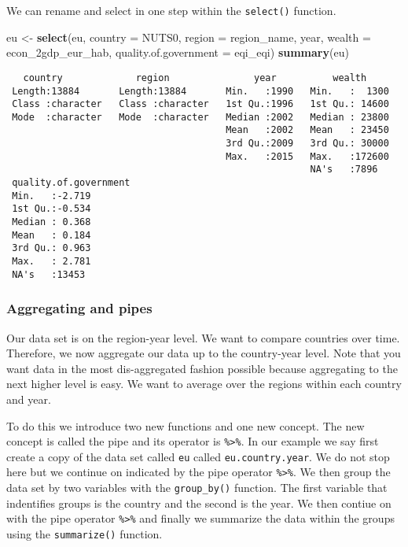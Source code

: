 \documentclass[]{article}
\newenvironment{Shaded}{\begin{snugshade}}{\end{snugshade}}
\newcommand{\DataTypeTok}[1]{\textcolor[rgb]{0.13,0.29,0.53}{#1}}
\newcommand{\KeywordTok}[1]{\textcolor[rgb]{0.13,0.29,0.53}{\textbf{#1}}}
\newcommand{\NormalTok}[1]{#1}
\newcommand{\StringTok}[1]{\textcolor[rgb]{0.31,0.60,0.02}{#1}}
\begin{document}
We can rename and select in one step within the \texttt{select()} function.

\begin{Shaded}
\begin{Highlighting}[]
\NormalTok{eu <-}\StringTok{ }\KeywordTok{select}\NormalTok{(eu,}
             \DataTypeTok{country =}\NormalTok{ NUTS0,}
             \DataTypeTok{region =}\NormalTok{ region_name,}
\NormalTok{             year,}
             \DataTypeTok{wealth =}\NormalTok{ econ_2gdp_eur_hab,}
             \DataTypeTok{quality.of.government =}\NormalTok{ eqi_eqi)}
\KeywordTok{summary}\NormalTok{(eu)}
\end{Highlighting}
\end{Shaded}

\begin{verbatim}
   country             region               year          wealth      
 Length:13884       Length:13884       Min.   :1990   Min.   :  1300  
 Class :character   Class :character   1st Qu.:1996   1st Qu.: 14600  
 Mode  :character   Mode  :character   Median :2002   Median : 23800  
                                       Mean   :2002   Mean   : 23450  
                                       3rd Qu.:2009   3rd Qu.: 30000  
                                       Max.   :2015   Max.   :172600  
                                                      NA's   :7896    
 quality.of.government
 Min.   :-2.719       
 1st Qu.:-0.534       
 Median : 0.368       
 Mean   : 0.184       
 3rd Qu.: 0.963       
 Max.   : 2.781       
 NA's   :13453        
\end{verbatim}

\hypertarget{aggregating-and-pipes}{%
\subsubsection{Aggregating and pipes}\label{aggregating-and-pipes}}

Our data set is on the region-year level. We want to compare countries over time. Therefore, we now aggregate our data up to the country-year level. Note that you want data in the most dis-aggregated fashion possible because aggregating to the next higher level is easy. We want to average over the regions within each country and year.

To do this we introduce two new functions and one new concept. The new concept is called the pipe and its operator is \texttt{\%\textgreater{}\%}. In our example we say first create a copy of the data set called \texttt{eu} called \texttt{eu.country.year}. We do not stop here but we continue on indicated by the pipe operator \texttt{\%\textgreater{}\%}. We then group the data set by two variables with the \texttt{group\_by()} function. The first variable that indentifies groups is the country and the second is the year. We then contiue on with the pipe operator \texttt{\%\textgreater{}\%} and finally we summarize the data within the groups using the \texttt{summarize()} function.
\end{document}
